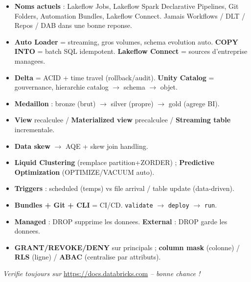 \documentclass[11pt,a4paper]{article}
\begin{document}
\begin{cle}
\begin{itemize}[leftmargin=*,nosep]
  \item \textbf{Noms actuels} : Lakeflow Jobs, Lakeflow Spark Declarative Pipelines, Git Folders,
  Automation Bundles, Lakeflow Connect. Jamais Workflows / DLT / Repos / DAB dans une bonne reponse.
  \item \textbf{Auto Loader} = streaming, gros volumes, schema evolution auto. \textbf{COPY INTO}
  = batch SQL idempotent. \textbf{Lakeflow Connect} = sources d'entreprise managees.
  \item \textbf{Delta} = ACID + time travel (rollback/audit). \textbf{Unity Catalog} = gouvernance,
  hierarchie catalog $\to$ schema $\to$ objet.
  \item \textbf{Medaillon} : bronze (brut) $\to$ silver (propre) $\to$ gold (agrege BI).
  \item \textbf{View} recalculee / \textbf{Materialized view} precalculee / \textbf{Streaming table} incrementale.
  \item \textbf{Data skew} $\rightarrow$ AQE + skew join handling.
  \item \textbf{Liquid Clustering} (remplace partition+ZORDER) ; \textbf{Predictive Optimization}
  (OPTIMIZE/VACUUM auto).
  \item \textbf{Triggers} : scheduled (temps) vs file arrival / table update (data-driven).
  \item \textbf{Bundles + Git + CLI} = CI/CD. \texttt{validate} $\to$ \texttt{deploy} $\to$ \texttt{run}.
  \item \textbf{Managed} : DROP supprime les donnees. \textbf{External} : DROP garde les donnees.
  \item \textbf{GRANT/REVOKE/DENY} sur principals ; \textbf{column mask} (colonne) / \textbf{RLS}
  (ligne) / \textbf{ABAC} (centralise par attributs).
\end{itemize}
\end{cle}

\vfill
\begin{center}
\textit{Verifie toujours sur} \url{https://docs.databricks.com} \textit{-- bonne chance !}
\end{center}
\end{document}
